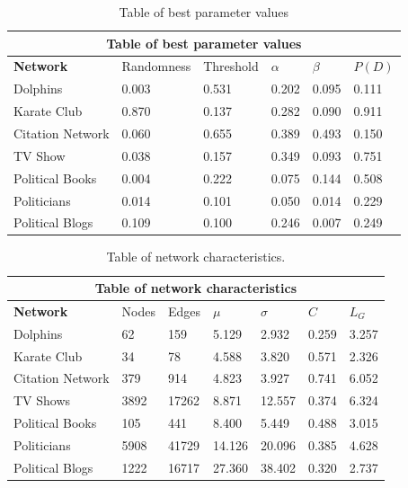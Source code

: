 \documentclass{article}
\begin{document}
\begin{table}[H]
\begin{center}
    
\begin{tabular}{ |p{3cm}||p{2cm}|p{2cm}|p{2cm}|p{2cm}|p{2cm}|}
    \hline
    \multicolumn{6}{|c|}{Table of best parameter values} \\
    \hline
    \bf{Network} & Randomness & Threshold & $\alpha$ & $\beta$ & $P(D)$\\
    \hline
    Dolphins   & 0.003    &0.531&   0.202&   0.095&   0.111\\
    Karate Club&   0.870  & 0.137   &0.282&   0.090&   0.911\\
    Citation Network   &0.060 & 0.655&  0.389&   0.493&   0.150\\
    TV Show & 0.038 & 0.157 & 0.349 & 0.093 & 0.751 \\
    Political Books &0.004 & 0.222&  0.075&   0.144&   0.508\\
    Politicians&   0.014  & 0.101 &0.050&   0.014&   0.229\\
    Political Blogs & 0.109  & 0.100   &0.246&   0.007&   0.249\\
    \hline
\end{tabular}
\end{center}
\caption{Table of best parameter values}
\end{table}

\begin{table}[H]
    \begin{center}
        
    \begin{tabular}{ |p{3cm}||p{1.5cm}|p{1.5cm}|p{1.5cm}|p{1.5cm}|p{1.5cm}|p{1.5cm}|}
        \hline
        \multicolumn{7}{|c|}{Table of network characteristics} \\
        \hline
        \bf{Network} & Nodes & Edges & $\mu$ & $\sigma$ & $C$ & $L_G$\\
        \hline
        Dolphins   & 62    &159&   5.129&   2.932 &   0.259 & 3.257\\
        Karate Club &34	&78	&4.588&	3.820&	0.571&	2.326\\
        Citation Network & 379 &	914	& 4.823	& 3.927 & 0.741 & 6.052 \\
        TV Shows & 3892 & 17262&8.871 & 12.557 & 0.374&6.324\\
        Political Books &105 &	441	& 8.400 &	5.449 &	0.488 &	3.015\\
        Politicians&  5908 &41729 & 14.126 & 20.096 &	0.385 & 4.628\\
        Political Blogs &	1222 & 16717 & 27.360 & 38.402 & 0.320 & 2.737\\
        \hline
    \end{tabular}
    \end{center}
    \caption{Table of network characteristics.}
    \end{table}
\end{document}

